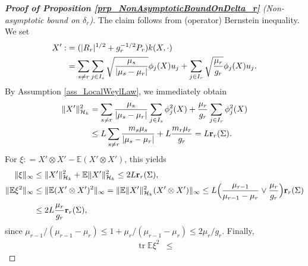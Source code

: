 \documentclass[a4paper,11pt]{article} %
\numberwithin{equation}{section}
\DeclareMathOperator*{\tr}{tr}
\theoremstyle{definition}
\theoremstyle{remark}
\theoremstyle{plain}
\begin{document}
\begin{proof}
  [\normalfont \textbf{Proof of Proposition \ref{prp_NonAsymptoticBoundOnDelta_r}}
   (Non-asymptotic bound on \( \delta_{r} \))]
  \label{prf_BoundOnDelta_r}
  The claim follows from (operator) Bernstein inequality. We set
  \begin{align}
         X': 
    & =   
         ( | R_{r} |^{ 1 / 2 } + g_{r}^{-1/2} P_{r} ) k(X, \cdot) 
    \\
    & =   
          \sum_{s\neq  r}\sum_{ j \in I_{s} }
          \sqrt{ \frac{ \mu_{s} }{ | \mu_{s} - \mu_{r} | } } 
          \phi_j(X) u_{j} 
        + 
          \sum_{ j \in I_{r} }\sqrt{ \frac{ \mu_{r} }{ g_{r} } } 
          \phi_j(X) u_{j}.
    \notag
  \end{align}
  By Assumption \ref{ass_LocalWeylLaw}, we
  immediately obtain
  \begin{align}
          \| X' \|_{\mathcal{H}_k}^{2}&=\sum_{s \neq r}
          \frac{ \mu_{s} }{ | \mu_{s} - \mu_{r} | }
          \sum_{ j \in I_{s} }
          \phi_j^2(X)+\frac{ \mu_{r} }{ g_{r} }  
          \sum_{ j \in I_{r} }
          \phi_j^2(X)
    \\
    & \le 
          L\sum_{s \neq r}
          \frac{ m_s\mu_{s} }{ | \mu_{s} - \mu_{r} | }+L\frac{m_r \mu_{r}}{g_{r}}
      =   
          L \mathbf{r}_{r}(\Sigma).
    \notag
  \end{align}
  For \( \xi: = X' \otimes X' - \mathbb{E} ( X' \otimes X' ) \), this yields
  \begin{align}
    \label{eq_XiOperatorBounds}
            \| \xi \|_\infty 
    & \le
            \| X' \|_{\mathcal{H}_k}^{2} + \mathbb{E}\| X' \|_{\mathcal{H}_k}^{2}
      \le
            2 L \mathbf{ r }_{ r }( \Sigma ),
    \\
            \| \mathbb{E} \xi^{2} \|_{ \infty } 
    & \le 
            \| \mathbb{E} ( X' \otimes X' )^{2} \|_{ \infty }
    = 
            \| \mathbb{E} \| X' \|_{\mathcal{H}_k}^{2} ( X' \otimes X' ) \|_{ \infty }
    \le
            L \Big( \frac{\mu_{r - 1}}{\mu_{r - 1} - \mu_{r}} \lor \frac{\mu_{r}}{g_{r}} \Big) \mathbf{r}_{r}(\Sigma)
    \notag
    \\
    & \le   2 L \frac{\mu_{r}}{g_{r}} \mathbf{r}_{r}(\Sigma), 
    \notag
  \end{align}
  since \( \mu_{r - 1} / (\mu_{r - 1} - \mu_{r}) \le 1 + \mu_{r} / (\mu_{r - 1} - \mu_{r}) \le 2 \mu_{r} / g_{r}\).
  Finally,
  \begin{align}
    \label{eq_XiTraceBound}
          \tr \mathbb{E} \xi^{2} 
    & \le

\end{align}
\end{proof}
\end{document}
